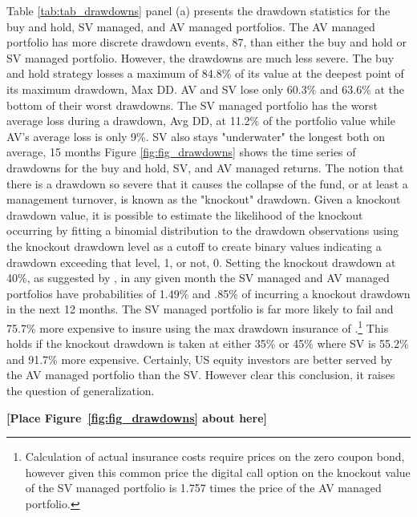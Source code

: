 Table \ref{tab:tab_drawdowns} panel (a) presents the drawdown statistics for the buy and hold, SV managed, and AV managed portfolios. The AV managed portfolio has more discrete drawdown events, 87, than either the buy and hold or SV managed portfolio. However, the drawdowns are much less severe. The buy and hold strategy losses a maximum of 84.8\% of its value at the deepest point of its maximum drawdown, Max DD. AV and SV lose only 60.3\% and 63.6\% at the bottom of their worst drawdowns. The SV managed portfolio has the worst average loss during a drawdown, Avg DD, at 11.2\% of the portfolio value while AV's average loss is only 9\%. SV also stays "underwater" the longest both on average, 15 months%
Figure \ref{fig:fig_drawdowns} shows the time series of drawdowns for the buy and hold, SV, and AV managed returns. %
The notion that there is a drawdown so severe that it causes the collapse of the fund, or at least a management turnover, is known as the "knockout" drawdown. \citep{pav_notes_nodate} Given a knockout drawdown value, it is possible to estimate the likelihood of the knockout occurring by fitting a binomial distribution to the drawdown observations using the knockout drawdown level as a cutoff to create binary values indicating a drawdown exceeding that level, 1, or not, 0. \citep{pav_notes_nodate} Setting the knockout drawdown at 40\%, as suggested by \citet{pav_notes_nodate}, in any given month the SV managed and AV managed portfolios have probabilities of 1.49\% and .85\% of incurring a knockout drawdown in the next 12 months. The SV managed portfolio is far more likely to fail and 75.7\% more expensive to insure using the max drawdown insurance of \citet{carr_maximum_2011}.\footnote{Calculation of actual insurance costs require prices on the zero coupon bond, however given this common price the digital call option on the knockout value of the SV managed portfolio is 1.757 times the price of the AV managed portfolio.} This holds if the knockout drawdown is taken at either 35\% or 45\% where SV is 55.2\% and 91.7\% more expensive. Certainly, US equity investors are better served by the AV managed portfolio than the SV. However clear this conclusion, it raises the question of generalization.

\bigskip
\centerline{\bf [Place Figure~\ref{fig:fig_drawdowns} about here]}
\bigskip


